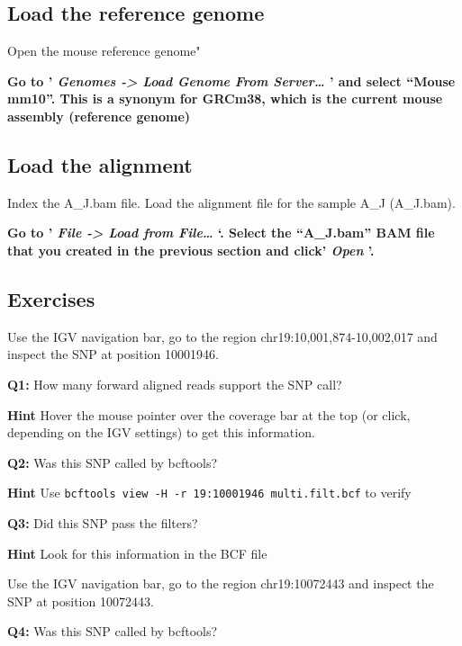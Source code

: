 \documentclass[11pt]{article}
\begin{document}
    \hypertarget{load-the-reference-genome}{%
\subsection{Load the reference genome}\label{load-the-reference-genome}}

Open the mouse reference genome"

\textbf{Go to ' \textit{Genomes -\textgreater{} Load Genome From
Server\ldots{}} ' and select ``Mouse mm10''. This is a synonym for
GRCm38, which is the current mouse assembly (reference genome)}

    \hypertarget{load-the-alignment}{%
\subsection{Load the alignment}\label{load-the-alignment}}

Index the A\_J.bam file.
Load the alignment file for the sample A\_J (A\_J.bam).

\textbf{Go to ' \textit{File -\textgreater{} Load from File\ldots{}} `.
Select the ``A\_J.bam'' BAM file that you created in the previous
section and click' \textit{Open} '.}

    \hypertarget{exercises}{%
\subsection{Exercises}\label{exercises}}

Use the IGV navigation bar, go to the region chr19:10,001,874-10,002,017
and inspect the SNP at position 10001946.

\textbf{Q1:} How many forward aligned reads support the SNP call?

\textbf{Hint} Hover the mouse pointer over the coverage bar at the top
(or click, depending on the IGV settings) to get this information.

\textbf{Q2:} Was this SNP called by bcftools?

\textbf{Hint} Use
\texttt{bcftools\ view\ -H\ -r\ 19:10001946\ multi.filt.bcf} to
verify

\textbf{Q3:} Did this SNP pass the filters?

\textbf{Hint} Look for this information in the BCF file

Use the IGV navigation bar, go to the region chr19:10072443 and inspect
the SNP at position 10072443.

\textbf{Q4:} Was this SNP called by bcftools?
\end{document}
